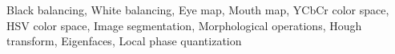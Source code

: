 Black balancing,  White balancing, Eye map, Mouth map, YCbCr color space, HSV color space,  
Image segmentation, Morphological operations, Hough transform, Eigenfaces, Local phase quantization 